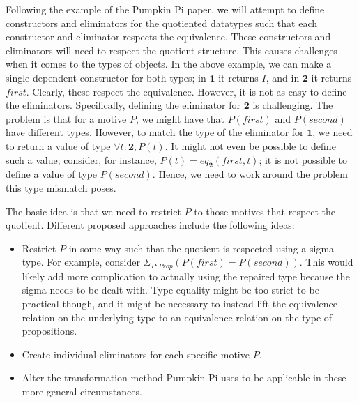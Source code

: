 \documentclass{article}
\begin{document}
Following the example of the Pumpkin Pi paper, we will attempt to define constructors and eliminators for the quotiented datatypes such that each constructor and eliminator respects the equivalence. These constructors and eliminators will need to respect the quotient structure. This causes challenges when it comes to the types of objects. In the above example, we can make a single dependent constructor for both types; in $\textbf{1}$ it returns $I$, and in $\textbf{2}$ it returns $first$. Clearly, these respect the equivalence. However, it is not as easy to define the eliminators. Specifically, defining the eliminator for $\textbf{2}$ is challenging. The problem is that for a motive $P$, we might have that $P(first)$ and $P(second)$ have different types. However, to match the type of the eliminator for $\textbf{1}$, we need to return a value of type $\forall t : \textbf{2}, P(t)$. It might not even be possible to define such a value; consider, for instance, $P(t) = eq_{\textbf{2}}(first, t)$; it is not possible to define a value of type $P(second)$. Hence, we need to work around the problem this type mismatch poses. 

The basic idea is that we need to restrict $P$ to those motives that respect the quotient. Different proposed approaches include the following ideas:
\begin{itemize}
\item Restrict $P$ in some way such that the quotient is respected using a sigma type. For example, consider $\Sigma_{P : Prop} (P(first) = P(second))$. This would likely add more complication to actually using the repaired type because the sigma needs to be dealt with. Type equality might be too strict to be practical though, and it might be necessary to instead lift the equivalence relation on the underlying type to an equivalence relation on the type of propositions. 
\item Create individual eliminators for each specific motive $P$. 
\item Alter the transformation method Pumpkin Pi uses to be applicable in these more general circumstances.
\end{itemize}
\end{document}
